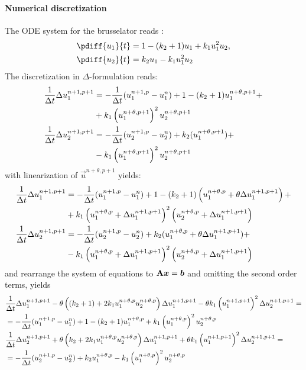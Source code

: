 \paragraph*{Numerical discretization}\label{sec:brusselator_discretization}

The  ODE system for the brusselator reads \citep[eq.\ 14,15]{AultHolmgreen2003}:
\begin{align}
    \pdiff{u_1}{t} & = 1 - (k_2 + 1) u_1 + k_1 u_1^2 u_2,
    \\
    \pdiff{u_2}{t} & = k_2 u_1 - k_1 u_1^2 u_2
    \label{eq:brusselator}
\end{align}
The discretization in $\Delta$-formulation reads:
\begin{align}
    \frac{1}{\Delta t}\Delta u_1^{n+1, p+1} & = - \frac{1}{\Delta t}(u_1^{n+1,p} - u_1^n) + 1 - (k_2 +1) u_1^{n+\theta,p+1} +
    \nonumber \\*
    &  + k_1 \left(u_1^{n+\theta,p+1}\right)^2 u_2^{n+\theta,p+1}
    \\
    \frac{1}{\Delta t}\Delta u_2^{n+1, p+1} & = - \frac{1}{\Delta t}(u_2^{n+1,p} - u_2^n) + k_2(u_1^{n+\theta,p+1})  +
    \nonumber \\*
    & - k_1 \left(u_1^{n+\theta,p+1}\right)^2 u_2^{n+\theta,p+1}
\end{align}
with linearization of $\vec{u}^{n+\theta,p+1}$ yields:
\begin{align}
    \frac{1}{\Delta t}\Delta u_1^{n+1, p+1} & =
    - \frac{1}{\Delta t}(u_1^{n+1,p} - u_1^n) + 1 - (k_2 +1) \left(u_1^{n+\theta,p} + \theta \Delta u_1^{n+1, p+1}\right)+
    \nonumber \\*
    &  + k_1 \left(u_1^{n+\theta,p}+\Delta u_1^{n+1, p+1}\right)^2 \left(u_2^{n+\theta,p}+ \Delta u_1^{n+1, p+1}\right)
    \\
    \frac{1}{\Delta t}\Delta u_2^{n+1, p+1} & = - \frac{1}{\Delta t}(u_2^{n+1,p} - u_2^n) + k_2 (u_1^{n+\theta,p} + \theta \Delta u_1^{n+1, p+1}) +
    \nonumber \\*
    &
    - k_1 \left(u_1^{n+\theta,p}+\Delta u_1^{n+1, p+1}\right)^2 \left(u_2^{n+\theta,p}+ \Delta u_1^{n+1, p+1}\right)
\end{align}
and rearrange the system of equations to $\mbox{\boldmath ${\rm A}$}\mbox{\boldmath $x$}=\mbox{\boldmath $b$}$ and omitting the second order terms, yields
\begin{align}
    &\frac{1}{\Delta t}\Delta u_1^{n+1, p+1}
    - \theta \left(\left(k_2 +1\right) + 2  k_1 u_1^{n+\theta,p} u_2^{n+\theta,p}\right)\Delta u_1 ^{n+1, p+1}
    - \theta k_1 \left(u_1^{n+1, p+1}\right)^2 \Delta u_2 ^{n+1, p+1} =
    \nonumber \\*
    & = - \frac{1}{\Delta t}(u_1^{n+1,p} - u_1^n) + 1 - (k_2 +1) u_1^{n+\theta,p} + k_1 \left(u_1^{n+\theta,p}\right)^2 u_2^{n+\theta,p}
    \\
    & \frac{1}{\Delta t}\Delta u_2^{n+1, p+1}
    + \theta \left( k_2 + 2 k_1 u_1^{n+\theta,p} u_2^{n+\theta,p} \right) \Delta u_1 ^{n+1, p+1}
    + \theta k_1\left(u_1^{n+1, p+1}\right)^2 \Delta u_2 ^{n+1, p+1}
    = \nonumber \\*
    & =- \frac{1}{\Delta t}(u_2^{n+1,p} - u_2^n) + k_2 u_1^{n+\theta,p}
    - k_1 \left(u_1^{n+\theta,p}\right)^2 u_2^{n+\theta,p}
\end{align}
